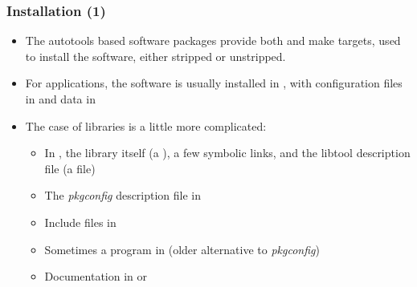 \begin{frame}
  \frametitle{Installation (1)}
  \begin{itemize}
  \item The autotools based software packages provide both
     and  make targets, used to
    install the software, either stripped or unstripped.
  \item For applications, the software is usually installed in
    , with configuration files in
     and data in
  \item The case of libraries is a little more complicated:
    \begin{itemize}
    \item In , the library itself (a
      ), a few symbolic links, and
      the libtool description file (a  file)
    \item The {\em pkgconfig} description file in
    \item Include files in 
    \item Sometimes a  program in
       (older alternative to {\em pkgconfig})
    \item Documentation in  or
    \end{itemize}
  \end{itemize}
\end{frame}


